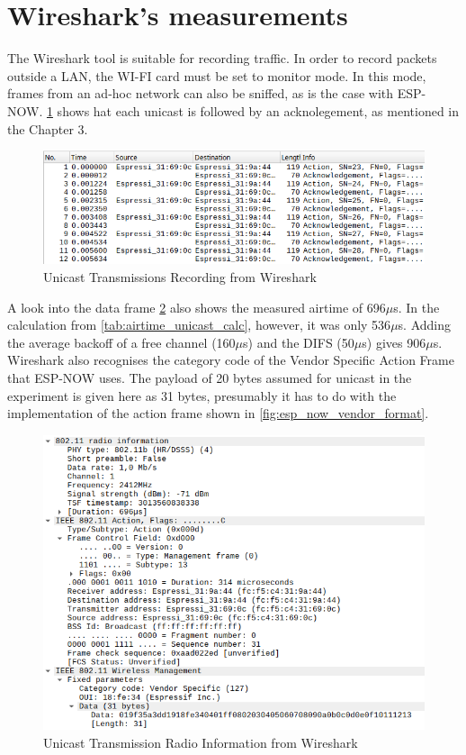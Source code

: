 \section{Wireshark's measurements}

The Wireshark tool is suitable for recording traffic.
In order to record packets outside a LAN, the WI-FI card must be set to monitor mode.
In this mode, frames from an ad-hoc network can also be sniffed, as is the case with ESP-NOW.
\cref{fig:wiresharkUC} shows hat each unicast is followed by an acknolegement, as mentioned in the Chapter 3.

\begin{figure}[h]
	\centering
	\includegraphics[scale=0.5]{figures/wiresharkUC.pdf}
	\caption{Unicast Transmissions Recording from Wireshark}
	\label{fig:wiresharkUC}
\end{figure}

A look into the data frame \cref{fig:wiresharkUCTransmission} also shows the measured airtime of 696$\mu$s.
In the calculation from \cref{tab:airtime_unicast_calc}, however, it was only 536$\mu$s.
Adding the average backoff of a free channel (160$\mu$s) and the DIFS (50$\mu$s) gives 906$\mu$s.
Wireshark also recognises the category code of the Vendor Specific Action Frame that ESP-NOW uses.
The payload of 20 bytes assumed for unicast in the experiment is given here as 31 bytes,
presumably it has to do with the implementation of the action frame shown in \cref{fig:esp_now_vendor_format}.

\begin{figure}[h]
	\centering
	\includegraphics[scale=0.4]{figures/wiresharkUCFrame.png}
	\caption{Unicast Transmission Radio Information from Wireshark}
	\label{fig:wiresharkUCTransmission}
\end{figure}

